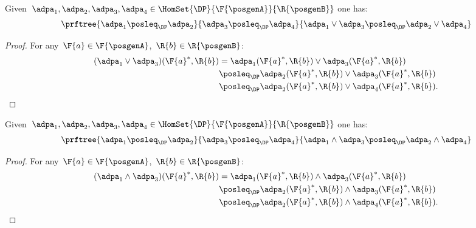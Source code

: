 \begin{lemma}
    \label{lem:coprod_mon}
    Given~$\adpa_1,\adpa_2,\adpa_3,\adpa_4 \in \HomSet{\DP}{\F{\posgenA}}{\R{\posgenB}}$ one has:
    \begin{equation*}
        \prftree{\adpa_1\posleq_\DP \adpa_2}{\adpa_3\posleq_\DP \adpa_4}{\adpa_1\vee \adpa_3\posleq_\DP \adpa_2\vee \adpa_4}
    \end{equation*}
\end{lemma}
\begin{proof}
    For any~$\F{a}\in \F{\posgenA}$,~$\R{b}\in \R{\posgenB}$:
    \begin{equation*}
        \begin{aligned}
        (\adpa_1 \vee \adpa_3)(\F{a}^*,\R{b})
            &=\adpa_1(\F{a}^*,\R{b})\vee \adpa_3(\F{a}^*,\R{b})\\
            &\posleq_\DP \adpa_2(\F{a}^*,\R{b})\vee \adpa_3(\F{a}^*,\R{b})\\
            &\posleq_\DP \adpa_2(\F{a}^*,\R{b})\vee \adpa_4(\F{a}^*,\R{b}).
        \end{aligned}
    \end{equation*}
\end{proof}


\begin{lemma}
    \label{lem:intersection_mon}
    Given~$\adpa_1,\adpa_2,\adpa_3,\adpa_4 \in \HomSet{\DP}{\F{\posgenA}}{\R{\posgenB}}$ one has:
    \begin{equation*}
        \prftree{\adpa_1\posleq_\DP \adpa_2}{\adpa_3\posleq_\DP \adpa_4}{\adpa_1\wedge \adpa_3\posleq_\DP \adpa_2\wedge \adpa_4}
    \end{equation*}
\end{lemma}
\begin{proof}
    For any~$\F{a}\in \F{\posgenA}$,~$\R{b}\in \R{\posgenB}$:
    \begin{equation*}
        \begin{aligned}
        (\adpa_1 \wedge \adpa_3)(\F{a}^*,\R{b})
            &=\adpa_1(\F{a}^*,\R{b})\wedge \adpa_3(\F{a}^*,\R{b})\\
            &\posleq_\DP \adpa_2(\F{a}^*,\R{b})\wedge \adpa_3(\F{a}^*,\R{b})\\
            &\posleq_\DP \adpa_2(\F{a}^*,\R{b})\wedge \adpa_4(\F{a}^*,\R{b}).
        \end{aligned}
    \end{equation*}
\end{proof}
